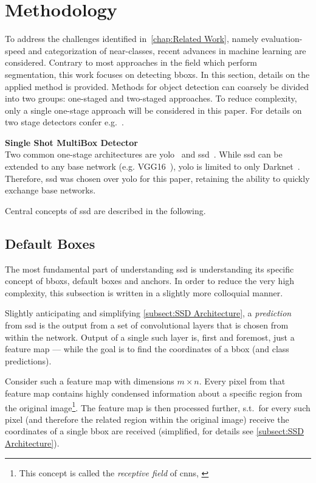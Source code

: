 \section{Methodology}\label{chap:Methodology}
To address the challenges identified in~\cref{chap:Related Work}, namely
evaluation-speed and categorization of near-classes, recent advances in machine
learning are considered. Contrary to most approaches in the field which perform
segmentation, this work focuses on detecting \glspl{bbox}. In this section,
details on the applied method is provided. Methods for object detection can coarsely
be divided into two groups: one-staged and two-staged approaches. To reduce complexity,
only a single one-stage approach will be considered in this paper. For details on
two stage detectors confer e.g.\ \cite{Ren.2015}.

\bigskip
{\large{\textbf{Single Shot MultiBox Detector}}}\\
Two common one-stage architectures are
\gls{yolo}~\cite{Redmon.2015, Redmon.2016b, Redmon.2018} and
\gls{ssd}~\cite{Liu.2016}. While \gls{ssd} can be extended to any base network
(e.g. VGG16~\cite{Simonyan.2015}), \gls{yolo} is limited to only Darknet~\cite{Redmon.2016}.
Therefore, \gls{ssd} was chosen over \gls{yolo} for this paper, retaining the
ability to quickly exchange base networks.

Central concepts of \gls{ssd} are described in the following.

\subsection{Default Boxes}\label{subsect:default-boxes}
The most fundamental part of understanding \gls{ssd} is understanding its specific
concept of \glspl{bbox}, default boxes and anchors. In order to reduce the very high
complexity, this subsection is written in a slightly more colloquial manner.

Slightly anticipating and simplifying \cref{subsect:SSD Architecture}, a
\emph{prediction} from \gls{ssd} is the output from a set of \glspl{convolutional layer}
that is chosen from within the network. Output of a single such \gls{layer} is,
first and foremost, just a \gls{feature map} --- while the goal is to find the
coordinates of a \gls{bbox} (and class predictions). 

Consider such a \gls{feature map} with dimensions \(m \times n\). Every pixel
from that \gls{feature map} contains highly condensed information about a specific
region from the original image\footnote{This concept is called the
\emph{receptive field} of \glspl{cnn}, \cite[cf.][331\psq]{Goodfellow.2016}}.
The \gls{feature map} is then processed further, s.t.\ for every such
pixel (and therefore the related region within the original image) receive the
coordinates of a single \gls{bbox} are received (simplified, for details see \cref{subsect:SSD Architecture}).


